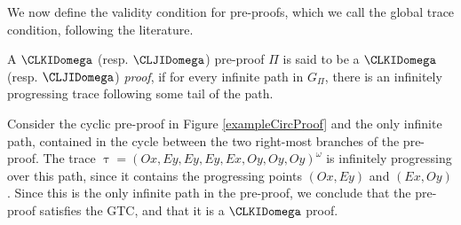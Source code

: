 We now define the validity condition for pre-proofs, which we call the global trace condition, following the literature.

\begin{definition}
    \label{def:GTC}
    A $\CLKIDomega$ (resp. $\CLJIDomega$) pre-proof $\Pi$ is said to be a $\CLKIDomega$ (resp. $\CLJIDomega$) \emph{proof}, if for every infinite path in $G_{\Pi}$, there is an infinitely progressing trace following some tail of the path.
\end{definition}

\begin{example}
    Consider the cyclic pre-proof in Figure \ref{exampleCircProof} and the only infinite path, contained in the cycle between the two right-most branches of the pre-proof. The trace $\uptau = (Ox, Ey, Ey, Ey, Ex, Oy, Oy, Oy)^{\omega}$  is infinitely progressing over this path, since it contains the progressing points $(Ox,Ey)$ and $(Ex,Oy)$. Since this is the only infinite path in the pre-proof, we conclude that the pre-proof satisfies the GTC, and
    that it is a $\CLKIDomega$ proof.
\end{example}

